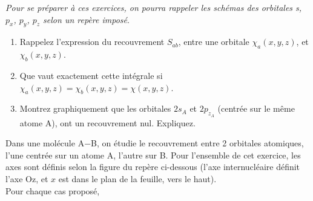 

\textit{Pour se pr\'eparer \`a ces exercices, on pourra rappeler les sch\'emas des orbitales s, $p_x$, $p_y$, $p_z$ selon un rep\`ere impos\'e}.

%
\begin{enumerate}[\bf 1)]
\item   Rappelez l'expression du recouvrement $S_{ab}$, entre une orbitale $ \chi_a(x,y,z)$, et
$\chi_b(x,y,z)$.
\item  Que vaut exactement cette int\'egrale si $ \chi_a(x,y,z)=\chi_b(x,y,z)=\chi(x,y,z)$.
\item    Montrez graphiquement que les orbitales $2s_A$ et $2p_{z_{A}}$ (centr\'ee sur le m\^eme atome A), ont un recouvrement nul. Expliquez.
\end{enumerate} %
\label{exo_s}
Dans une mol\'ecule A$-$B, on \'etudie le recouvrement entre 2 orbitales atomiques, l'une centr\'ee sur un atome A, l'autre sur  B. Pour l'ensemble de cet exercice, les axes sont d\'efinis selon la figure du rep\`ere ci-dessous (l'axe internucl\'eaire d\'efinit l'axe Oz, et $x$ est dans le plan de la feuille, vers le haut). 
\\

Pour chaque cas propos\'e,

